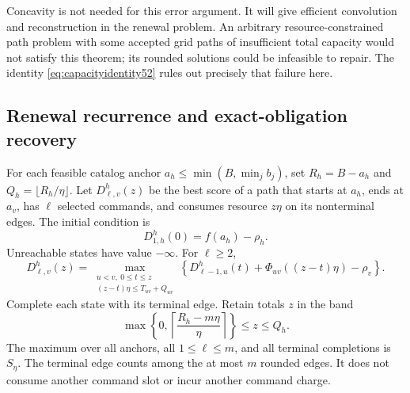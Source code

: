 Concavity is not needed for this error argument. It will give efficient convolution and reconstruction in the renewal problem. An arbitrary resource-constrained path problem with some accepted grid paths of insufficient total capacity would not satisfy this theorem; its rounded solutions could be infeasible to repair. The identity \eqref{eq:capacityidentity52} rules out precisely that failure here.

\subsection{Renewal recurrence and exact-obligation recovery}
For each feasible catalog anchor $a_h\leq\min(B,\min_jb_j)$, set $R_h=B-a_h$ and $Q_h=\lfloor R_h/\eta\rfloor$. Let $D^{h}_{\ell,v}(z)$ be the best score of a path that starts at $a_h$, ends at $a_v$, has $\ell$ selected commands, and consumes resource $z\eta$ on its nonterminal edges. The initial condition is
\[
 D^h_{1,h}(0)=f(a_h)-\rho_h.
\]
Unreachable states have value $-\infty$. For $\ell\geq2$,
\begin{equation}\label{eq:dp52}
 D^h_{\ell,v}(z)=\max_{\substack{u<v,\ 0\leq t\leq z\\(z-t)\eta\leq T_{uv}+Q_{uv}}}
 \left\{D^h_{\ell-1,u}(t)+\Phi_{uv}((z-t)\eta)-\rho_v\right\}.
\end{equation}
Complete each state with its terminal edge. Retain totals $z$ in the band
\begin{equation}\label{eq:renewalband52}
 \max\left\{0,\left\lceil\frac{R_h-m\eta}{\eta}\right\rceil\right\}\leq z\leq Q_h.
\end{equation}
The maximum over all anchors, all $1\leq\ell\leq m$, and all terminal completions is $S_\eta$. The terminal edge counts among the at most $m$ rounded edges. It does not consume another command slot or incur another command charge.

